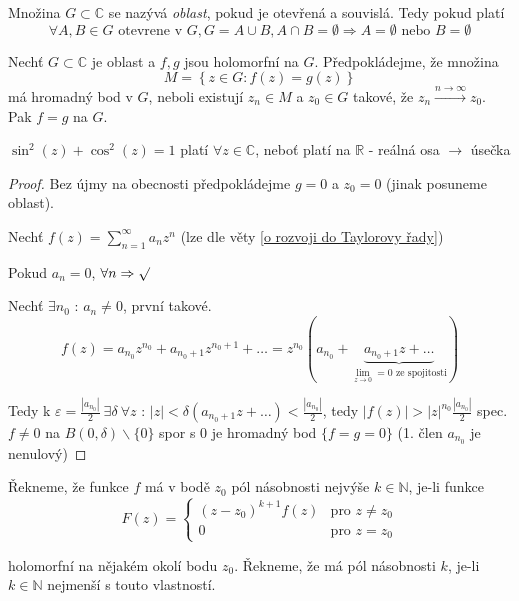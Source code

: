 \begin{definice}
Množina $G \subset \mathbb{C}$ se nazývá \emph{oblast}, pokud je otevřená a souvislá. Tedy pokud platí
$$\forall A, B \in G \textrm{ otevrene v } G, G=A \cup B, A \cap B = \emptyset \Rightarrow A = \emptyset \textrm{ nebo } B = \emptyset$$
\end{definice}

\begin{vetal}
Nechť $G \subset \mathbb{C}$ je oblast a $f, g$ jsou holomorfní na $G$. Předpokládejme, že množina
$$M = \left\{ z \in G : f(z)=g(z) \right\} $$
má hromadný bod v $G$, neboli existují $z_n \in M$ a $z_0 \in G$ takové, že $z_n \stackrel{n \rightarrow \infty}{\rightarrow} z_0$. Pak $f=g$ na $G$.
\end{vetal}

\begin{dusledek}
$\sin^2 (z) + \cos^2 (z) = 1$ platí $\forall z \in \mathbb{C}$, neboť platí na $\mathbb{R}$ - reálná osa $\to$ úsečka
\end{dusledek}

\begin{proof}
Bez újmy na obecnosti předpokládejme $g=0$ a $z_0=0$ (jinak posuneme oblast).

Nechť $f(z) = \sum_{n=1}^\infty a_n z^n$ (lze dle věty \ref{o rozvoji do Taylorovy řady})

Pokud $a_n = 0$, $\forall n \Rightarrow \surd$

Nechť $\exists n_0 \textrm{ : } a_n \neq 0$, první takové. 
$$f(z) = a_{n_0} z^{n_0} + a_{n_0 + 1} z^{n_0 + 1} + \ldots = z^{n_0} \left( a_{n_0} + \underbrace{a_{n_0 + 1} z + \ldots}_{\lim_{z \to 0} = 0 \textrm{ ze spojitosti}} \right)$$

Tedy k $\varepsilon = \frac{|a_{n_0}|}{2} \ \exists \delta \ \forall z \textrm{ : } |z| < \delta (a_{n_0 + 1} z + \ldots) < \frac{|a_{n_0}|}{2}$, tedy $|f(z)| > |z|^{n_0} \frac{|a_{n_0}|}{2}$ spec. $f \neq 0$ na $B(0, \delta) \backslash \{ 0 \}$ spor s $0$ je hromadný bod $\{ f = g = 0 \}$ (1. člen $a_{n_0}$ je nenulový)
\end{proof}


\begin{definice}
Řekneme, že funkce $f$ má v bodě $z_0$ pól násobnosti nejvýše $k \in \mathbb{N}$, je-li funkce 
\begin{equation}
F(z) = \left\{ \begin{array}{ll}
 (z-z_0)^{k+1}f(z) & \textrm{pro $z \neq z_0$} \nonumber\\
 0 & \textrm{pro $z=z_0$}
  \end{array} \right.
\end{equation}

holomorfní na nějakém okolí bodu $z_0$. Řekneme, že má pól násobnosti $k$, je-li $k \in \mathbb{N}$ nejmenší s touto vlastností.
\end{definice}

